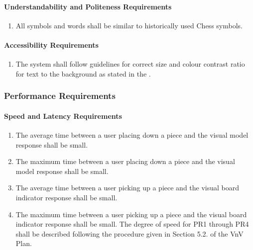 \documentclass[12pt]{article}
\begin{document}
{\paragraph{Understandability and Politeness Requirements}
\begin{enumerate}[{UH}1., leftmargin=2\parindent, resume]
    \item All symbols and words shall be similar to historically used Chess symbols. \cite{ChessHistory2003}
\end{enumerate}

\paragraph{Accessibility Requirements}
\begin{enumerate}[{UH}1., leftmargin=2\parindent, resume]
    \item The system shall follow guidelines for correct size and colour contrast ratio for text to the background as stated in the \cite{WCAG2018}.
\end{enumerate}



\subsubsection{Performance Requirements}
\label{NFR_PR}
\paragraph{Speed and Latency Requirements}
\begin{enumerate}[{PR}1., leftmargin=2\parindent]
    \item The average time between a user placing down a piece and the visual model response shall be small.
    \item The maximum time between a user placing down a piece and the visual model response shall be small.
    \item The average time between a user picking up a piece and the visual board indicator response shall be small.
    \item The maximum time between a user picking up a piece and the visual board indicator response shall be small. 
    The degree of speed for PR1 through PR4 shall be described following the procedure given in Section 5.2.\thevnvSectionNfr{}
    of the VnV Plan.
\end{enumerate}

}
\end{document}
